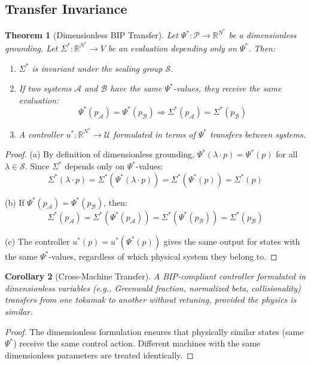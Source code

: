 \documentclass[11pt]{article}
\newtheorem{theorem}{Theorem}[section]
\newtheorem{corollary}[theorem]{Corollary}
\begin{document}
\subsection{Transfer Invariance}

\begin{theorem}[Dimensionless BIP Transfer]
\label{thm:transfer}
Let $\Psi^* : \mathcal{P} \to \mathbb{R}^{N^*}$ be a dimensionless grounding.
Let $\Sigma^* : \mathbb{R}^{N^*} \to V$ be an evaluation depending only on $\Psi^*$. Then:
\begin{enumerate}
    \item[(a)] $\Sigma^*$ is invariant under the scaling group $\mathcal{S}$.
    \item[(b)] If two systems $\mathcal{A}$ and $\mathcal{B}$ have the same $\Psi^*$-values, they receive the same evaluation:
    \[
    \Psi^*(p_{\mathcal{A}}) = \Psi^*(p_{\mathcal{B}}) \Rightarrow \Sigma^*(p_{\mathcal{A}}) = \Sigma^*(p_{\mathcal{B}})
    \]
    \item[(c)] A controller $u^* : \mathbb{R}^{N^*} \to \mathcal{U}$ formulated in terms of $\Psi^*$ transfers between systems.
\end{enumerate}
\end{theorem}

\begin{proof}
(a) By definition of dimensionless grounding, $\Psi^*(\lambda \cdot p) = \Psi^*(p)$ for all $\lambda \in \mathcal{S}$. Since $\Sigma^*$
depends only on $\Psi^*$-values:
\[
\Sigma^*(\lambda \cdot p) = \Sigma^*(\Psi^*(\lambda \cdot p)) = \Sigma^*(\Psi^*(p)) = \Sigma^*(p)
\]

(b) If $\Psi^*(p_{\mathcal{A}}) = \Psi^*(p_{\mathcal{B}})$, then:
\[
\Sigma^*(p_{\mathcal{A}}) = \Sigma^*(\Psi^*(p_{\mathcal{A}})) = \Sigma^*(\Psi^*(p_{\mathcal{B}})) = \Sigma^*(p_{\mathcal{B}})
\]

(c) The controller $u^*(p) = u^*(\Psi^*(p))$ gives the same output for states with the same $\Psi^*$-values, regardless of which physical system they belong to.
\end{proof}

\begin{corollary}[Cross-Machine Transfer]
A BIP-compliant controller formulated in dimensionless variables (e.g., Greenwald fraction, normalized beta, collisionality) transfers from one
tokamak to another without retuning, provided the physics is similar.
\end{corollary}

\begin{proof}
The dimensionless formulation ensures that physically similar states (same $\Psi^*$) receive
the same control action. Different machines with the same dimensionless parameters are treated
identically.
\end{proof}
\end{document}
